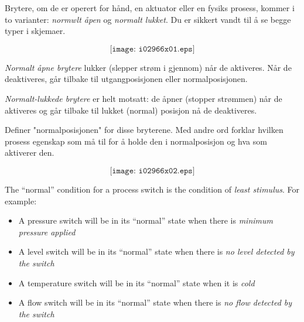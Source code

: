 

Brytere, om de er operert for hånd, en aktuator eller en fysiks prosess, kommer i to varianter: \textit{normwlt åpen} og \textit{normalt lukket}. Du er sikkert vandt til å se begge typer i skjemaer. 

$$\texttt{[image: i02966x01.eps]}$$

\textit{Normalt åpne brytere} lukker (slepper strøm i gjennom) når de aktiveres. Når de deaktiveres, går tilbake til utgangposisjonen eller normalposisjonen. 

\textit{Normalt-lukkede brytere} er helt motsatt: de åpner (stopper strømmen) når de aktiveres og går tilbake til lukket (normal) posisjon nå de deaktiveres. 

\vskip 10pt

Definer "normalposisjonen" for disse bryterene. Med andre ord forklar hvilken prosess egenskap som må til for å holde den i normalposisjon og hva som  aktiverer den. 

$$\texttt{[image: i02966x02.eps]}$$








The ``normal'' condition for a process switch is the condition of {\it least stimulus}.  For example:

\vskip 10pt

\begin{itemize}
\item{} A pressure switch will be in its ``normal'' state when there is {\it minimum pressure applied}
\vskip 10pt
\item{} A level switch will be in its ``normal'' state when there is {\it no level detected by the switch}
\vskip 10pt
\item{} A temperature switch will be in its ``normal'' state when it is {\it cold}
\vskip 10pt
\item{} A flow switch will be in its ``normal'' state when there is {\it no flow detected by the switch}
\end{itemize}






